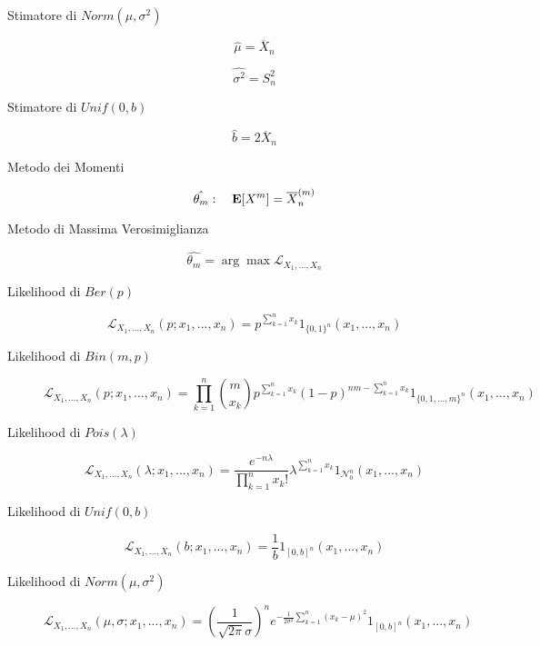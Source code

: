 \begin{description}
	\item[Stimatore di $Norm(\mu,\sigma^{2})$]
	\begin{equation}
	\hat{\mu} = \overline{X}_{n}
	\end{equation}
	
	\begin{equation}
	\hat{\sigma^{2}} = S_{n}^{2}
	\end{equation}
	
	\item[Stimatore di $Unif(0,b)$]
	\begin{equation}
	\hat{b} = 2\overline{X}_{n}
	\end{equation}
	
	\item[Metodo dei Momenti]
	\begin{equation}
	\hat{\theta_{m}}:\quad \mathbf{E}[X^{m}]=\overline{X}_{n}^{(m)} 
	\end{equation}
	
	\item[Metodo di Massima Verosimiglianza]
	\begin{equation}
	\hat{\theta_{m}} = \arg\max\mathcal{L}_{X_{1},...,X_{n}}
	\end{equation}
	
	\item[Likelihood di $Ber(p)$]
	\begin{equation}
	\mathcal{L}_{X_{1},...,X_{n}}(p;x_{1},...,x_{n})=
	p^{\sum_{k=1}^{n}x_{k}}
	\mathfrak{1}_{\{0,1\}^{n}}(x_{1},...,x_{n})
	\end{equation}
	
	\item[Likelihood di $Bin(m,p)$]
	\begin{equation}
	\mathcal{L}_{X_{1},...,X_{n}}(p;x_{1},...,x_{n})=
	\prod_{k=1}^{n}\binom{m}{x_{k}} p^{\sum_{k=1}^{n}x_{k}}(1-p)^{nm-\sum_{k=1}^{n}x_{k}}
	\mathfrak{1}_{\{0,1,...,m\}^{n}}(x_{1},...,x_{n})
	\end{equation}
	
	\item[Likelihood di $Pois(\lambda)$]
	\begin{equation}
	\mathcal{L}_{X_{1},...,X_{n}}(\lambda;x_{1},...,x_{n})=
	\frac{e^{-n\lambda}}{\prod_{k=1}^{n}x_{k}!}\lambda^{\sum_{k=1}^{n}x_{k}}
	\mathfrak{1}_{\mathcal{N}_{0}^{n}}(x_{1},...,x_{n})
	\end{equation}
	
	\item[Likelihood di $Unif(0,b)$]
	\begin{equation}
	\mathcal{L}_{X_{1},...,X_{n}}(b;x_{1},...,x_{n})=
	\frac{1}{b}
	\mathfrak{1}_{[0,b]^{n}}(x_{1},...,x_{n})
	\end{equation}
	
	\item[Likelihood di $Norm(\mu,\sigma^{2})$]
	\begin{equation}
	\mathcal{L}_{X_{1},...,X_{n}}(\mu,\sigma;x_{1},...,x_{n})=
	(\frac{1}{\sqrt{2\pi}\sigma})^{n}e^{-\frac{1}{2\sigma^{2}}\sum_{k=1}^{n}(x_{k}-\mu)^{2}}
	\mathfrak{1}_{[0,b]^{n}}(x_{1},...,x_{n})
	\end{equation}
\end{description}


